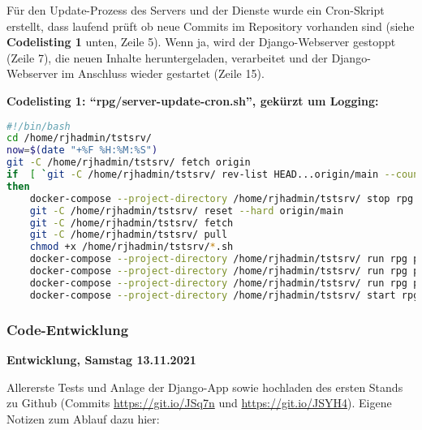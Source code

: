 Für den Update-Prozess des Servers und der Dienste wurde ein Cron-Skript erstellt, dass laufend prüft ob neue Commits im Repository vorhanden sind (siehe \textbf{Codelisting 1} unten, Zeile 5). Wenn ja, wird der Django-Webserver gestoppt (Zeile 7), die neuen Inhalte heruntergeladen, verarbeitet und der Django-Webserver im Anschluss wieder gestartet (Zeile 15). 

\textbf{Codelisting 1: \enquote{rpg/server-update-cron.sh}, gekürzt um Logging:}
\begin{lstlisting}[language=bash]
#!/bin/bash
cd /home/rjhadmin/tstsrv/
now=$(date "+%F %H:%M:%S")
git -C /home/rjhadmin/tstsrv/ fetch origin 
if  [ `git -C /home/rjhadmin/tstsrv/ rev-list HEAD...origin/main --count` != 0 ] 
then
    docker-compose --project-directory /home/rjhadmin/tstsrv/ stop rpg  
    git -C /home/rjhadmin/tstsrv/ reset --hard origin/main  
    git -C /home/rjhadmin/tstsrv/ fetch
    git -C /home/rjhadmin/tstsrv/ pull 
    chmod +x /home/rjhadmin/tstsrv/*.sh 
    docker-compose --project-directory /home/rjhadmin/tstsrv/ run rpg python rpg/manage.py makemigrations 
    docker-compose --project-directory /home/rjhadmin/tstsrv/ run rpg python rpg/manage.py migrate 
    docker-compose --project-directory /home/rjhadmin/tstsrv/ run rpg python rpg/manage.py loaddata db_sample_data.json 
    docker-compose --project-directory /home/rjhadmin/tstsrv/ start rpg 
\end{lstlisting}
\subsubsection{Code-Entwicklung}


\textbf{Entwicklung, Samstag 13.11.2021}

Allererste Tests und Anlage der Django-App sowie  hochladen des ersten Stands zu Github (Commits \url{https://git.io/JSq7n} und \url{https://git.io/JSYH4}). Eigene Notizen zum Ablauf dazu hier: 


